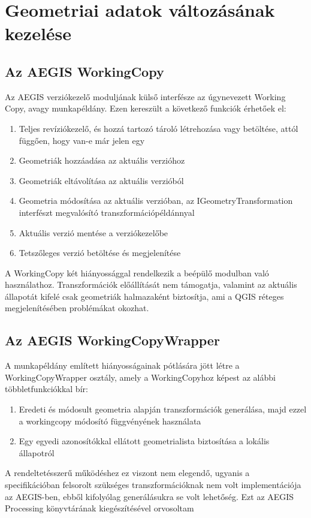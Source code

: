 \section{Geometriai adatok változásának kezelése}
\subsection{Az AEGIS WorkingCopy}
Az AEGIS verziókezelő moduljának külső interfésze az úgynevezett Working Copy, avagy munkapéldány. Ezen kereszült a következő funkciók érhetőek el:
\begin{enumerate}
	\item Teljes revíziókezelő, és hozzá tartozó tároló létrehozása vagy betöltése, attól függően, hogy van-e már jelen egy
	\item Geometriák hozzáadása az aktuális verzióhoz
	\item Geometriák eltávolítása az aktuális verzióból
	\item Geometria módosítása az aktuális verzióban, az IGeometryTransformation interfészt megvalósító transzformációpéldánnyal
	\item Aktuális verzió mentése a verziókezelőbe
	\item Tetszőleges verzió betöltése és megjelenítése
\end{enumerate}
A WorkingCopy két hiányossággal rendelkezik a beépülő modulban való használathoz. Transzformációk előállítását nem támogatja, valamint az aktuális állapotát kifelé csak geometriák halmazaként biztosítja, ami a QGIS réteges megjelenítésében problémákat okozhat.
\subsection{Az AEGIS WorkingCopyWrapper}
A munkapéldány említett hiányosságainak pótlására jött létre a WorkingCopyWrapper osztály, amely a WorkingCopyhoz képest az alábbi többletfunkciókkal bír:
\begin{enumerate}
	\item Eredeti és módosult geometria alapján transzformációk generálása, majd ezzel a workingcopy módosító függvényének használata
	\item Egy egyedi azonosítókkal ellátott geometrialista biztosítása a lokális állapotról
\end{enumerate}
A rendeltetésszerű működéshez ez viszont nem elegendő, ugyanis a specifikációban felsorolt szükséges transzformációknak nem volt implementációja az AEGIS-ben, ebből kifolyólag generálásukra se volt lehetőség. Ezt az AEGIS Processing könyvtárának kiegészítésével orvosoltam
